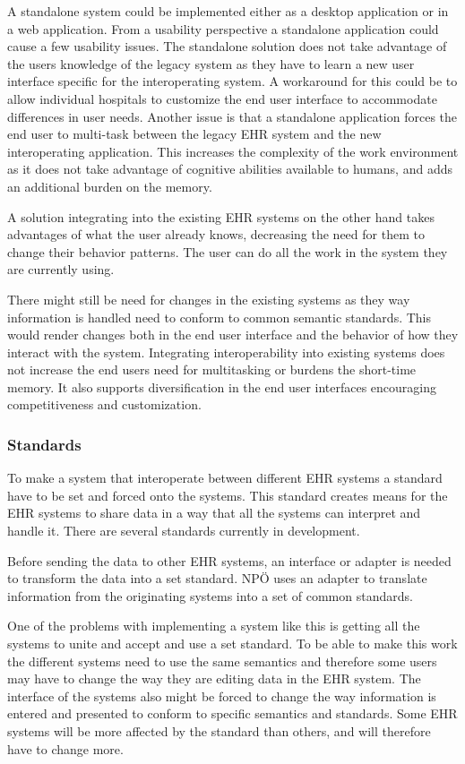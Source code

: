 \documentclass[14pt]{article}
\begin{document}
A standalone system could be implemented either as a desktop application or in a web application. From a usability perspective a standalone application could cause a few usability issues. The standalone solution does not take advantage of the users knowledge of the legacy system as they have to learn a new user interface specific for the interoperating system. A workaround for this could be to allow individual hospitals to customize the end user interface to accommodate differences in user needs. 
Another issue is that a standalone application forces the end user to multi-task between the legacy \gls{EHR} system and the new interoperating application. This increases the complexity of the work environment as it does not take advantage of cognitive abilities available to humans, and adds an additional burden on the memory. 

A solution integrating into the existing \gls{EHR} systems on the other hand takes advantages of what the user already knows, decreasing the need for them to change their behavior patterns. The user can do all the work in the system they are currently using.

There might still be need for changes in the existing systems as they way information is handled need to conform to common semantic standards. This would render changes both in the end user interface and the behavior of how they interact with the system. Integrating interoperability into existing systems does not increase the end users need for multitasking or burdens the short-time memory. It also supports diversification in the end user interfaces encouraging competitiveness and customization.

\subsubsection{Standards}
To make a system that interoperate between different \gls{EHR} systems a standard have to be set and forced onto the systems. This standard creates means for the \gls{EHR} systems to share data in a way that all the systems can interpret and handle it. There are several standards currently in development.

Before sending the data to other \gls{EHR} systems, an interface or adapter is needed to transform the data into a set standard. NPÖ uses an adapter to translate information from the originating systems into a set of common standards. 

One of the problems with implementing a system like this is getting all the systems to unite and accept and use a set standard. To be able to make this work the different systems need to use the same semantics and therefore some users may have to change the way they are editing data in the \gls{EHR} system. The interface of the systems also might be forced to change the way information is entered and presented to conform to specific semantics and standards. Some \gls{EHR} systems will be more affected by the standard than others, and will therefore have to change more.
\end{document}
